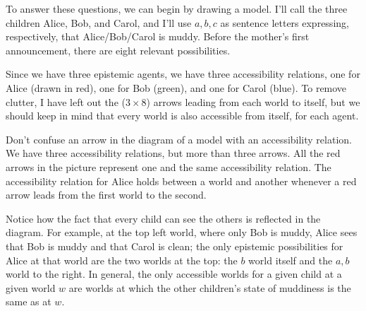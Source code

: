To answer these questions, we can begin by drawing a model. I'll call the three
children Alice, Bob, and Carol, and I'll use $a,b,c$ as sentence letters
expressing, respectively, that Alice/Bob/Carol is muddy. Before the mother's first announcement, there are eight relevant possibilities.

\begin{center}
\end{center}
%
Since we have three epistemic agents, we have three accessibility relations, one
for Alice (drawn in red), one for Bob (green), and one for Carol (blue). To
remove clutter, I have left out the ($3\times 8$) arrows leading from each
world to itself, but we should keep in mind that every world is also accessible
from itself, for each agent.

Don't confuse an arrow in the diagram of a model with an accessibility relation.
We have three accessibility relations, but more than three arrows. All the red
arrows in the picture represent one and the same accessibility relation. The
accessibility relation for Alice holds between a world and another whenever a
red arrow leads from the first world to the second.

Notice how the fact that every child can see the others is reflected in the
diagram. For example, at the top left world, where only Bob is muddy, Alice sees that Bob
is muddy and that Carol is clean; the only epistemic possibilities for Alice at
that world are the two worlds at the top: the $b$ world itself and the $a,b$ world to the right. In
general, the only accessible worlds for a given child at a given world $w$ are
worlds at which the other children's state of muddiness is the same as at $w$.

